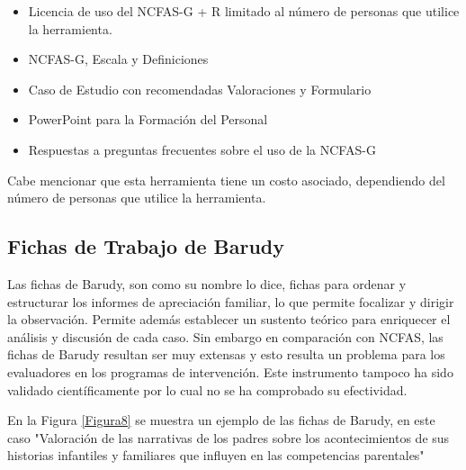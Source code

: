 \begin{itemize}
	\item Licencia de uso del NCFAS-G + R limitado al número de personas que utilice la herramienta. 
	\item NCFAS-G, Escala y Definiciones
	\item Caso de Estudio con recomendadas Valoraciones y  Formulario
	\item PowerPoint para la Formación del Personal
	\item Respuestas a preguntas frecuentes sobre el uso de la NCFAS-G
\end{itemize}

Cabe mencionar que esta herramienta tiene un costo asociado, dependiendo del número de personas que utilice la herramienta. 

\vspace{2mm}


\subsection{Fichas de Trabajo de Barudy} 
\label{fbarudy}

Las fichas de Barudy, son como su nombre lo dice, fichas para ordenar y estructurar los informes de apreciación familiar, lo que permite focalizar y dirigir la observación. 
Permite además establecer un sustento teórico para enriquecer el análisis y discusión de cada caso. Sin embargo en comparación con NCFAS, las fichas de Barudy resultan ser muy extensas y esto resulta un problema para los evaluadores en los programas de intervención. Este instrumento tampoco ha sido validado científicamente por lo cual no se ha comprobado su efectividad.\\

\clearpage
\newpage

En la Figura \ref{Figura8} se muestra un ejemplo de las fichas de Barudy, en este caso "Valoración de las narrativas de los padres sobre los acontecimientos de sus historias infantiles y familiares que influyen en las competencias parentales" \cite{barudy2010desafios}

